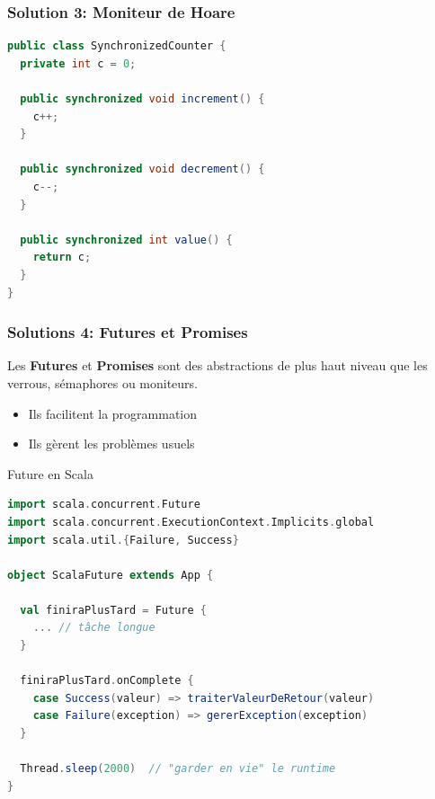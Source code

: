 \documentclass{beamer}
\begin{document}
\begin{frame}[fragile]
 \frametitle{Solution 3: Moniteur de Hoare}
 \begin{lstlisting}[language=Java]
public class SynchronizedCounter {
  private int c = 0;

  public synchronized void increment() {
    c++;
  }

  public synchronized void decrement() {
    c--;
  }

  public synchronized int value() {
    return c;
  }
}
\end{lstlisting}
\end{frame}
\begin{frame}
  \frametitle{Solutions 4: Futures et Promises}
  Les \textbf{Futures} et \textbf{Promises} sont des abstractions
  de plus haut niveau que les verrous, sémaphores ou moniteurs.
  \begin{itemize}
  \item Ils facilitent la programmation
  \item Ils gèrent les problèmes usuels
  \end{itemize}
\end{frame} %
\begin{frame}[fragile]{Future en Scala}
  \begin{lstlisting}[language=Scala]
import scala.concurrent.Future
import scala.concurrent.ExecutionContext.Implicits.global
import scala.util.{Failure, Success}

object ScalaFuture extends App {

  val finiraPlusTard = Future {
    ... // tâche longue
  }

  finiraPlusTard.onComplete {
    case Success(valeur) => traiterValeurDeRetour(valeur)
    case Failure(exception) => gererException(exception)
  }

  Thread.sleep(2000)  // "garder en vie" le runtime
}
  \end{lstlisting}
\end{frame}
\end{document}
